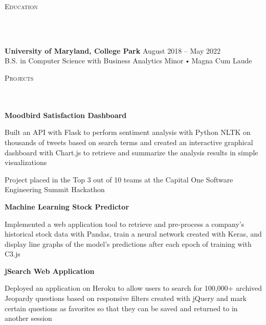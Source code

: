 \documentclass{article}
\newcommand{\header}[1]{{
\hspace*{-15pt}\vspace*{10pt} \large \scshape{#1}} \vspace*{-6pt} 
\lineunder
}
\newcommand{\lineunder}{
\vspace*{-8pt} \\ \hspace*{-18pt} 
\hrulefill \\
}
\newcommand{\school}[4]{
\textbf{#1} #2 \hfill #3 \\ #4 \vspace*{5pt}
}
\newcommand{\project}[4]{{
\vspace*{2pt}%
\textbf{#1} #2 \hfill #3\\ #4 \vspace*{2pt}}
}
\renewcommand{\labelitemi}{
$\vcenter{\hbox{\tiny$\bullet$}}$\hspace*{3pt}
}
\renewcommand{\labelitemii}{
$\vcenter{\hbox{\tiny$\bullet$}}$\hspace*{-3pt}
}
\newenvironment{bullet-list-minor}{
\begin{list}{\labelitemii}{\setlength\leftmargin{15pt} 
\topsep 0pt \itemsep 1pt}}{\vspace*{4pt}\end{list}
}
\begin{document}
\smallskip
\medskip

\header{Education}
    \vspace{4pt}
    \school{University of Maryland, College Park}{}{August 2018 -- May 2022}{\vspace{4pt}  B.S. in Computer Science with Business Analytics Minor \labelitemi Magna Cum Laude}


\medskip

\header{Projects}
    \vspace{4pt}
    \project{Moodbird Satisfaction Dashboard}{}{}{}
	\begin{bullet-list-minor} 
	\item Built an API with Flask to perform sentiment analysis with Python NLTK on thousands of tweets based on search terms and created an interactive graphical dashboard with Chart.js to retrieve and summarize the analysis results in simple visualizations
	\item Project placed in the Top 3 out of 10 teams at the Capital One Software Engineering Summit Hackathon
    \end{bullet-list-minor}
    \medskip
    
    \project{Machine Learning Stock Predictor}{}{}{}
	\begin{bullet-list-minor}
	\item Implemented a web application tool to retrieve and pre-process a company's historical stock data with Pandas, train a neural network created with Keras, and display line graphs of the model's predictions after each epoch of training with C3.js
    \end{bullet-list-minor}
    \medskip  
    

    \project{jSearch Web Application}{}{}{}
	\begin{bullet-list-minor}
	\item Deployed an application on Heroku to allow users to search for 100,000+ archived Jeopardy questions based on responsive filters created with jQuery and mark certain questions as favorites so that they can be saved and returned to in another session
    \end{bullet-list-minor}
\end{document}
